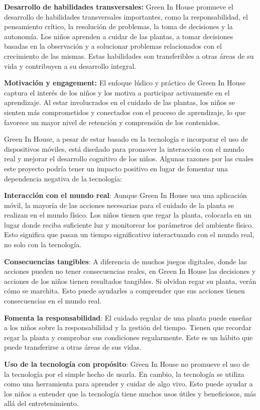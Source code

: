 \textbf{Desarrollo de habilidades transversales:} Green In House promueve el desarrollo de habilidades transversales importantes, como la responsabilidad, el pensamiento crítico, la resolución de problemas, la toma de decisiones y la autonomía. Los niños aprenden a cuidar de las plantas, a tomar decisiones basadas en la observación y a solucionar problemas relacionados con el crecimiento de las mismas. Estas habilidades son transferibles a otras áreas de su vida y contribuyen a su desarrollo integral.

\textbf{Motivación y engagement:} El enfoque lúdico y práctico de Green In House captura el interés de los niños y los motiva a participar activamente en el aprendizaje. Al estar involucrados en el cuidado de las plantas, los niños se sienten más comprometidos y conectados con el proceso de aprendizaje, lo que favorece un mayor nivel de retención y comprensión de los contenidos.

Green In House, a pesar de estar basado en la tecnología e incorporar el uso de dispositivos móviles, está diseñado para promover la interacción con el mundo real y mejorar el desarrollo cognitivo de los niños. Algunas razones por las cuales este proyecto podría tener un impacto positivo en lugar de fomentar una dependencia negativa de la tecnología:

\textbf{Interacción con el mundo real}: Aunque Green In House usa una aplicación móvil, la mayoría de las acciones necesarias para el cuidado de la planta se realizan en el mundo físico. Los niños tienen que regar la planta, colocarla en un lugar donde reciba suficiente luz y monitorear los parámetros del ambiente físico. Esto significa que pasan un tiempo significativo interactuando con el mundo real, no solo con la tecnología.

\textbf{Consecuencias tangibles}: A diferencia de muchos juegos digitales, donde las acciones pueden no tener consecuencias reales, en Green In House las decisiones y acciones de los niños tienen resultados tangibles. Si olvidan regar su planta, verán cómo se marchita. Esto puede ayudarles a comprender que sus acciones tienen consecuencias en el mundo real.

\textbf{Fomenta la responsabilidad}: El cuidado regular de una planta puede enseñar a los niños sobre la responsabilidad y la gestión del tiempo. Tienen que recordar regar la planta y comprobar sus condiciones regularmente. Este es un hábito que puede transferirse a otras áreas de sus vidas.

\textbf{Uso de la tecnología con propósito}: Green In House no promueve el uso de la tecnología por el simple hecho de usarla. En cambio, la tecnología se utiliza como una herramienta para aprender y cuidar de algo vivo. Esto puede ayudar a los niños a entender que la tecnología tiene muchos usos útiles y beneficiosos, más allá del entretenimiento.

